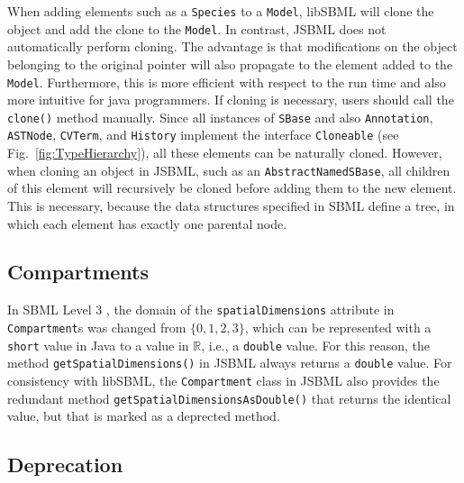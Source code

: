 \documentclass[
  BCOR12mm,
  letterpaper,
  11pt,
  headsepline,
  pointlessnumbers,
  tablecaptionabove,
  onelinecaption,
  headinclude,
  appendixprefix,
  idxtotoc,
  bibtotoc,
  twoside,
  titlepage
]{scrartcl}
\begin{document}
When adding elements such as a \texttt{Species} to a \texttt{Model}, libSBML will
clone the object and add the clone to the \texttt{Model}. In contrast, JSBML does
not automatically perform cloning. The advantage is that modifications on the
object belonging to the original pointer will also propagate to the element
added to the \texttt{Model}. Furthermore, this is more efficient with respect to
the run time and also more intuitive for java programmers. If cloning is
necessary, users should call the \texttt{clone()} method manually. Since all instances of \texttt{SBase} and also
\texttt{Annotation}, \texttt{ASTNode}, \texttt{CVTerm}, and \texttt{History} implement
the interface \texttt{Cloneable} (see Fig.~\vref{fig:TypeHierarchy}), all these
elements can be naturally cloned. However, when cloning an object in
JSBML, such as an \texttt{AbstractNamedSBase},
all children of this element will recursively be cloned before adding them to
the new element. This is necessary, because the data structures specified in
SBML
define a tree, in which each element has exactly one parental node.

\subsection{Compartments}

In SBML Level 3 \citep{Hucka2010a}, the domain of the
\texttt{spatialDimensions} attribute in \texttt{Compartment}s
was changed from $\lbrace 0, 1, 2, 3\rbrace$, which can be represented with a
\texttt{short} value in Java to a value in $\mathbb{R}$, i.e., a \texttt{double}
value. For this reason, the method \texttt{getSpatialDimensions()} in JSBML
always returns a \texttt{double} value. For consistency with libSBML, the
\texttt{Compartment} class in JSBML also provides the redundant method
\texttt{getSpatialDimensionsAsDouble()} that returns the identical value, but
that is marked as a deprected method.


\subsection{Deprecation}
\end{document}
